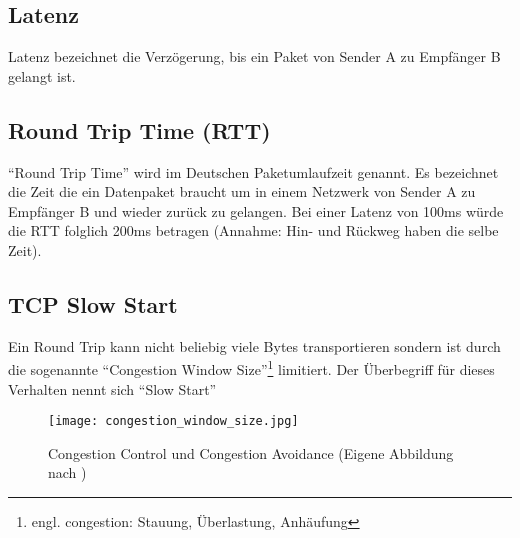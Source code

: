 	\subsection{Latenz} %
	\label{sub:latenz}
		Latenz bezeichnet die Verzögerung, bis ein Paket von Sender A zu Empfänger B gelangt ist.


	\subsection{Round Trip Time (RTT)} %
	\label{sub:round_trip_time_}
		"`Round Trip Time"' wird im Deutschen Paketumlaufzeit genannt. Es bezeichnet die Zeit die ein Datenpaket braucht um in einem Netzwerk von Sender A zu Empfänger B und wieder zurück zu gelangen. Bei einer Latenz von 100ms würde die RTT folglich 200ms betragen (Annahme: Hin- und Rückweg haben die selbe Zeit).
	

	\subsection{TCP Slow Start} %
	\label{sub:tcp_slow_start}

		Ein Round Trip kann nicht beliebig viele Bytes transportieren sondern ist durch die sogenannte "`Congestion Window Size"'\footnote{engl. congestion: Stauung, Überlastung, Anhäufung} limitiert. Der Überbegriff für dieses Verhalten nennt sich "`Slow Start"'

		\begin{figure}[htbp]
			\begin{center}
				\texttt{[image: congestion\_window\_size.jpg]}
				\caption{Congestion Control und Congestion Avoidance (Eigene Abbildung nach \autocite{grigorikSlowStart})}
				\label{fig:congestion_window_size}
			\end{center}
		\end{figure} 

